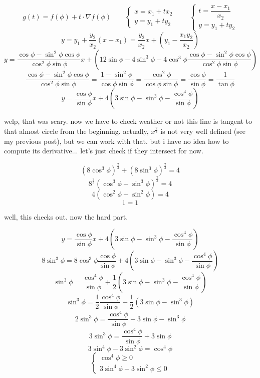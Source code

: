 \documentclass{article}
\begin{document}
  \[
    g(t) = f(\phi) + t \cdot \nabla f(\phi) \qquad
    \begin{cases}
      x = x_1 + t x_2 \\
      y = y_1 + t y_2
    \end{cases} \qquad
    \begin{cases}
      t = \dfrac{x - x_1}{x_2} \\
      y = y_1 + t y_2
    \end{cases}
  \]
  \[
    y = y_1 + \frac{y_2}{x_2} (x - x_1) = \frac{y_2}{x_2} x + \left(y_1 - \frac{x_1y_2}{x_2}\right)
  \]
  \[
    y = \frac{\cos \phi - \sin^2\phi\cos \phi}{\cos^2\phi \sin \phi} x + \left(12 \sin \phi - 4 \sin^3 \phi - 4\cos^3\phi\frac{\cos \phi - \sin^2\phi\cos \phi}{\cos^2\phi \sin \phi}\right)
  \]
  \[
    \frac{\cos \phi - \sin^2\phi\cos \phi}{\cos^2\phi \sin \phi} =
    \frac{1 - \sin^2\phi}{\cos\phi \sin \phi} =
    \frac{\cos^2\phi}{\cos\phi \sin \phi} =
    \frac{\cos\phi}{\sin \phi} = \frac{1}{\tan\phi}
  \]
  \[
    y = \frac{\cos\phi}{\sin \phi} x + 4\left(3 \sin \phi - \sin^3 \phi -\frac{\cos^4\phi}{\sin \phi}\right)
  \]

  welp, that was scary. now we have to check weather or not this line is tangent to that almost circle from the beginning.
  actually, $x^\frac{2}{3}$ is not very well defined (see my previous post), but we can work with that.
  but i have no idea how to compute its derivative...
  let's just check if they intersect for now.

  \[
    (8 \cos^3 \phi)^\frac{2}{3} + (8 \sin^3 \phi)^\frac{2}{3} = 4
  \]
  \[
    8^\frac{2}{3} (\cos^3 \phi + \sin^3 \phi)^\frac{2}{3} = 4
  \]
  \[
    4 (\cos^2 \phi + \sin^2 \phi) = 4
  \]
  \[
    1 = 1
  \]

  well, this checks out. now the hard part.

  \[
    y = \frac{\cos\phi}{\sin \phi} x + 4\left(3 \sin \phi - \sin^3 \phi -\frac{\cos^4\phi}{\sin \phi}\right)
  \]
  \[
    8 \sin^3 \phi = 8 \cos^3 \phi \frac{\cos\phi}{\sin \phi} + 4\left(3 \sin \phi - \sin^3 \phi -\frac{\cos^4\phi}{\sin \phi}\right)
  \]
  \[
    \sin^3 \phi = \frac{\cos^4\phi}{\sin \phi} + \frac{1}{2}\left(3 \sin \phi - \sin^3 \phi -\frac{\cos^4\phi}{\sin \phi}\right)
  \]
  \[
    \sin^3 \phi = \frac{1}{2}\frac{\cos^4\phi}{\sin \phi} + \frac{1}{2}\left(3 \sin \phi - \sin^3 \phi\right)
  \]
  \[
    2\sin^3 \phi = \frac{\cos^4\phi}{\sin \phi} + 3 \sin \phi - \sin^3 \phi
  \]
  \[
    3\sin^3 \phi = \frac{\cos^4\phi}{\sin \phi} + 3 \sin \phi
  \]
  \[
    3\sin^4 \phi - 3 \sin^2 \phi = \cos^4\phi
  \]
  \[
    \begin{cases}
      \cos^4\phi \geq 0 \\
      3\sin^4 \phi - 3 \sin^2 \phi \leq 0
    \end{cases}
  \]
\end{document}
